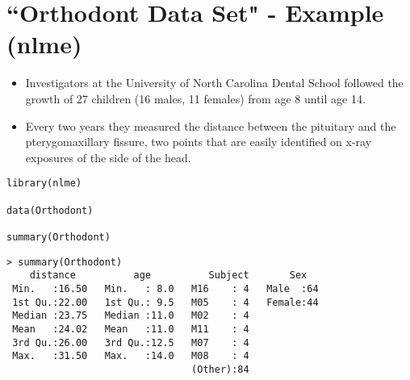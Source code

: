 \documentclass[main.tex]{subfiles}
\begin{document}
\section{``Orthodont Data Set" -  Example (nlme) }

\begin{itemize}
\item Investigators at the University of North Carolina Dental School followed the growth of 27 children (16 males, 11 females) from age 8 until age 14. 
\item Every two years they measured the distance between the pituitary and the pterygomaxillary fissure, two points that are easily identified on x-ray exposures of the side of the head.
\end{itemize}

\begin{framed}
\begin{verbatim}
library(nlme)

data(Orthodont)

summary(Orthodont)

\end{verbatim}
\end{framed}

\begin{verbatim}
> summary(Orthodont)
    distance          age          Subject       Sex    
 Min.   :16.50   Min.   : 8.0   M16    : 4   Male  :64  
 1st Qu.:22.00   1st Qu.: 9.5   M05    : 4   Female:44  
 Median :23.75   Median :11.0   M02    : 4              
 Mean   :24.02   Mean   :11.0   M11    : 4              
 3rd Qu.:26.00   3rd Qu.:12.5   M07    : 4              
 Max.   :31.50   Max.   :14.0   M08    : 4              
                                (Other):84
\end{verbatim}
\end{document}
